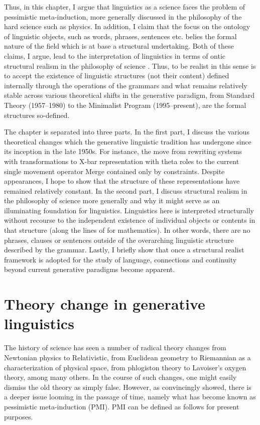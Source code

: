 \documentclass[output=paper]{langscibook}
\begin{document}
Thus, in this chapter, I argue that linguistics as a science faces the problem of pessimistic meta-induction, more generally discussed in the philosophy of the hard science such as physics. In addition, I claim that the focus on the ontology of linguistic objects, such as words, phrases, sentences etc. belies the formal nature of the field which is at base a structural undertaking. Both of these claims, I argue, lead to the interpretation of linguistics in terms of ontic structural realism in the philosophy of science \citep{Ladyman1998, French2006}. Thus, to be realist in this sense is to accept the existence of linguistic structures (not their content) defined internally through the operations of the grammars and what remains relatively stable across various theoretical shifts in the generative paradigm, from Standard Theory (1957--1980) to the Minimalist Program (1995--present), are the formal structures so-defined. 

The chapter is separated into three parts. In the first part, I discuss the various theoretical changes which the generative linguistic tradition has undergone since its inception in the late 1950s. For instance, the move from rewriting systems with transformations to X-bar representation \citep{Chomsky1970} with theta roles to the current single movement operator Merge contained only by constraints. Despite appearances, I hope to show that the structure of these representations have remained relatively constant. In the second part, I discuss structural realism in the philosophy of science more generally and why it might serve as an illuminating foundation for linguistics. Linguistics here is interpreted structurally without recourse to the independent existence of individual objects or contents in that structure (along the lines of \citealt{Shapiro1997} for mathematics). In other words, there are no phrases, clauses or sentences outside of the overarching linguistic structure described by the grammar. Lastly, I briefly show that once a structural realist framework is adopted for the study of language, connections and continuity beyond current generative paradigms become apparent.  

\section{Theory change in generative linguistics}
\label{sec:nefdt:theorychange}

The history of science has seen a number of radical theory changes from Newtonian physics to Relativistic, from Euclidean geometry to Riemannian as a characterization of physical space, from phlogiston theory to Lavoiser's oxygen theory, among many others. In the course of such changes, one might easily dismiss the old theory as simply false. However, as \cite{Laudan1981} convincingly showed, there is a deeper issue looming in the passage of time, namely what has become known as pessimistic meta-induction (PMI). PMI can be defined as follows for present purposes. 
\end{document}
